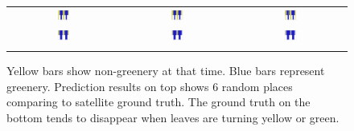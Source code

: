 \begin{figure}[th!]
\begin{center}
\begin{tabular}{ccc}
\includegraphics[width=0.14\textwidth]{bar/8560.jpg} &
\includegraphics[width=0.14\textwidth]{bar/8561.jpg} &
\includegraphics[width=0.14\textwidth]{bar/8881.jpg} \\
\includegraphics[width=0.14\textwidth]{bar/8911.jpg} &
\includegraphics[width=0.14\textwidth]{bar/9705.jpg} &
\includegraphics[width=0.14\textwidth]{bar/10816.jpg} \\
\\
\end{tabular}
\end{center}
\vspace{-24pt}
\caption{Yellow bars show non-greenery at that time. Blue bars represent greenery. Prediction results on top shows 6 random places comparing to satellite ground truth. The ground truth on the bottom tends to disappear when leaves are turning yellow or green.}
\label{fig:placeinbar}
\vspace{-12pt}
\end{figure}

